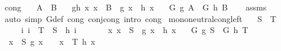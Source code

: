 \begin{isabellebody}
\isanewline
{}\isamarkupfalse%
%
\endisatagproof
{\isafoldproof}%
%
\isadelimproof
\isanewline
%
\endisadelimproof
\isanewline
{}\isamarkupfalse%
\ cong{\isacharprime}{\kern0pt}{\isacharcolon}{\kern0pt}\isanewline
\ \ \ {\isachardoublequoteopen}A\ {\isacharequal}{\kern0pt}\ B{\isachardoublequoteclose}\isanewline
\ \ \ g{\isacharunderscore}{\kern0pt}h{\isacharcolon}{\kern0pt}\ {\isachardoublequoteopen}{\isasymAnd}x{\isachardot}{\kern0pt}\ x\ {\isasymin}\ B\ {\isasymLongrightarrow}\ g\ x\ {\isacharequal}{\kern0pt}\ h\ x{\isachardoublequoteclose}\isanewline
\ \ \ {\isachardoublequoteopen}G\ g\ A\ {\isacharequal}{\kern0pt}\ G\ h\ B{\isachardoublequoteclose}\isanewline
%
\isadelimproof
\ \ %
\endisadelimproof
%
\isatagproof
{}\isamarkupfalse%
\ assms\ \isamarkupfalse%
\ {\isacharparenleft}{\kern0pt}auto\ simp{\isacharcolon}{\kern0pt}\ G{\isacharunderscore}{\kern0pt}def\ cong{\isacharcolon}{\kern0pt}\ conj{\isacharunderscore}{\kern0pt}cong\ intro{\isacharcolon}{\kern0pt}\ cong{\isacharparenright}{\kern0pt}%
\endisatagproof
{\isafoldproof}%
%
\isadelimproof
\isanewline
%
\endisadelimproof
\isanewline
\isanewline
{}\isamarkupfalse%
\ mono{\isacharunderscore}{\kern0pt}neutral{\isacharunderscore}{\kern0pt}cong{\isacharunderscore}{\kern0pt}left{\isacharprime}{\kern0pt}{\isacharcolon}{\kern0pt}\isanewline
\ \ \ {\isachardoublequoteopen}S\ {\isasymsubseteq}\ T{\isachardoublequoteclose}\isanewline
\ \ \ \ \ {\isachardoublequoteopen}{\isasymAnd}i{\isachardot}{\kern0pt}\ i\ {\isasymin}\ T\ {\isacharminus}{\kern0pt}\ S\ {\isasymLongrightarrow}\ h\ i\ {\isacharequal}{\kern0pt}\ \isanewline
\ \ \ \ \ {\isachardoublequoteopen}{\isasymAnd}x{\isachardot}{\kern0pt}\ x\ {\isasymin}\ S\ {\isasymLongrightarrow}\ g\ x\ {\isacharequal}{\kern0pt}\ h\ x{\isachardoublequoteclose}\isanewline
\ \ \ {\isachardoublequoteopen}G\ g\ S\ {\isacharequal}{\kern0pt}\ G\ h\ T{\isachardoublequoteclose}\isanewline
%
\isadelimproof
%
\endisadelimproof
%
\isatagproof
{}\isamarkupfalse%
\ {\isacharminus}{\kern0pt}\isanewline
\ \ \isamarkupfalse%
\ {\isacharasterisk}{\kern0pt}{\isacharcolon}{\kern0pt}\ {\isachardoublequoteopen}{\isacharbraceleft}{\kern0pt}x\ {\isasymin}\ S{\isachardot}{\kern0pt}\ g\ x\ {\isasymnoteq}\ \ {\isacharequal}{\kern0pt}\ {\isacharbraceleft}{\kern0pt}x\ {\isasymin}\ T{\isachardot}{\kern0pt}\ h\ x\ {\isasymnoteq}\ \isanewline

\end{isabellebody}
